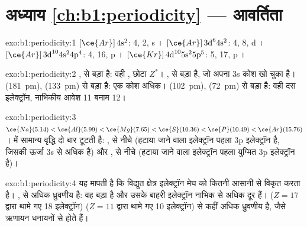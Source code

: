 \section*{अध्याय \ref{ch:b1:periodicity} --- आवर्तिता}

\begin{solution}{exo:b1:periodicity:1}
 $[\ce{Ar}]\,4\text{s}^2$:  4,  2, s । 
$[\ce{Ar}]\,3\text{d}^6 4\text{s}^2$:  4,  8, d । 
$[\ce{Ar}]\,3\text{d}^{10} 4\text{s}^2 4\text{p}^4$:  4,  16, p
।  $[\ce{Kr}]\,4\text{d}^{10} 5\text{s}^2 5\text{p}^5$:  5,
 17, p ।
\end{solution}

\begin{solution}{exo:b1:periodicity:2}
,  से बड़ा है: वही , छोटा $Z^{*}$। ,
 से बड़ा है, जो अपना 3s कोश खो चुका है। 
(\qty{181}{pm}),  (\qty{133}{pm}) से बड़ा है: एक कोश अधिक।
 (\qty{102}{pm}),  (\qty{72}{pm}) से बड़ा है: वही
दस इलेक्ट्रॉन, नाभिकीय आवेश 11 बनाम 12।
\end{solution}

\begin{solution}{exo:b1:periodicity:3}
$\ce{Na} (5.14) < \ce{Al} (5.99) < \ce{Mg} (7.65) < \ce{S} (10.36) <
\ce{P} (10.49) < \ce{Ar} (15.76)$।  में सामान्य वृद्धि
दो बार टूटती है: ,  से नीचे (हटाया जाने वाला इलेक्ट्रॉन पहला
3p इलेक्ट्रॉन है, जिसकी ऊर्जा 3s से अधिक है) और ,  से नीचे
(हटाया जाने वाला इलेक्ट्रॉन पहला युग्मित 3p इलेक्ट्रॉन है)।
\end{solution}

\begin{solution}{exo:b1:periodicity:4}
 यह मापती है कि विद्युत क्षेत्र इलेक्ट्रॉन मेघ को कितनी आसानी से
विकृत करता है। ,  से अधिक ध्रुवणीय है: वह बड़ा है
और उसके बाहरी इलेक्ट्रॉन नाभिक से अधिक दूर हैं।  ($Z = 17$ द्वारा
थामे गए 18 इलेक्ट्रॉन)  ($Z = 11$ द्वारा
थामे गए 10 इलेक्ट्रॉन) से कहीं अधिक ध्रुवणीय है, जैसे ऋणायन धनायनों से होते हैं।
\end{solution}

